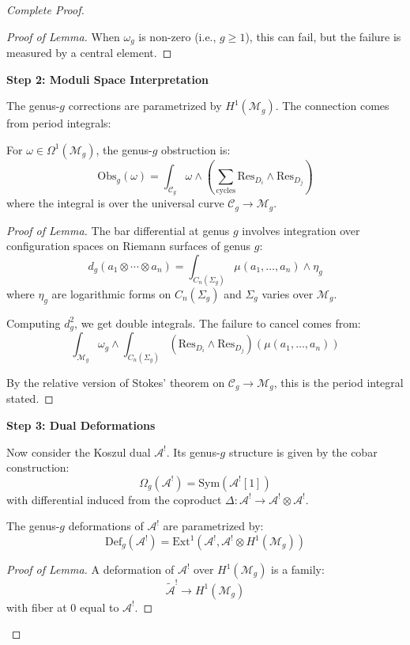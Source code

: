 \begin{proof}[Complete Proof]
\begin{proof}[Proof of Lemma]
When $\omega_g$ is non-zero (i.e., $g \geq 1$), this can fail, but the failure is 
measured by a central element.
\end{proof}

\textbf{Step 2: Moduli Space Interpretation}

The genus-$g$ corrections are parametrized by $H^1(\mathcal{M}_g)$. The connection 
comes from period integrals:

\begin{lemma}\label{lem:period-integral}
For $\omega \in \Omega^1(\mathcal{M}_g)$, the genus-$g$ obstruction is:
$$\text{Obs}_g(\omega) = \int_{\mathcal{C}_g} \omega \wedge 
\left(\sum_{\text{cycles}} \text{Res}_{D_i} \wedge \text{Res}_{D_j}\right)$$
where the integral is over the universal curve $\mathcal{C}_g \to \mathcal{M}_g$.
\end{lemma}

\begin{proof}[Proof of Lemma]
The bar differential at genus $g$ involves integration over configuration spaces on 
Riemann surfaces of genus $g$:
$$d_g(a_1 \otimes \cdots \otimes a_n) = \int_{C_n(\Sigma_g)} \mu(a_1, \ldots, a_n) 
\wedge \eta_g$$
where $\eta_g$ are logarithmic forms on $C_n(\Sigma_g)$ and $\Sigma_g$ varies over 
$\mathcal{M}_g$.

Computing $d_g^2$, we get double integrals. The failure to cancel comes from:
$$\int_{\mathcal{M}_g} \omega_g \wedge \int_{C_n(\Sigma_g)} 
(\text{Res}_{D_i} \wedge \text{Res}_{D_j})(\mu(a_1, \ldots, a_n))$$

By the relative version of Stokes' theorem on $\mathcal{C}_g \to \mathcal{M}_g$, 
this is the period integral stated.
\end{proof}

\textbf{Step 3: Dual Deformations}

Now consider the Koszul dual $\mathcal{A}^!$. Its genus-$g$ structure is given by 
the cobar construction:
$$\Omega_g(\mathcal{A}^!) = \text{Sym}(\mathcal{A}^![1])$$
with differential induced from the coproduct $\Delta: \mathcal{A}^! \to 
\mathcal{A}^! \otimes \mathcal{A}^!$.

\begin{lemma}\label{lem:deformation-space}
The genus-$g$ deformations of $\mathcal{A}^!$ are parametrized by:
$$\text{Def}_g(\mathcal{A}^!) = \text{Ext}^1(\mathcal{A}^!, \mathcal{A}^! 
\otimes H^1(\mathcal{M}_g))$$
\end{lemma}

\begin{proof}[Proof of Lemma]
A deformation of $\mathcal{A}^!$ over $H^1(\mathcal{M}_g)$ is a family:
$$\tilde{\mathcal{A}}^! \to H^1(\mathcal{M}_g)$$
with fiber at $0$ equal to $\mathcal{A}^!$.


\end{proof}
\end{proof}

